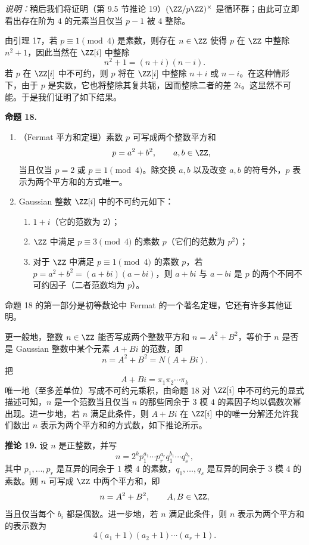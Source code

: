 \noindent\emph{说明：}稍后我们将证明（第 9.5 节推论 19）$(\ZZ/p\ZZ)^\times$ 是循环群；由此可立即看出存在阶为 $4$ 的元素当且仅当 $p-1$ 被 $4$ 整除。

由引理 17，若 $p\equiv1\pmod4$ 是素数，则存在 $n\in\ZZ$ 使得 $p$ 在 $\ZZ$ 中整除 $n^2+1$，因此当然在 $\ZZ[i]$ 中整除
\[
n^2+1=(n+i)(n-i).
\]
若 $p$ 在 $\ZZ[i]$ 中不可约，则 $p$ 将在 $\ZZ[i]$ 中整除 $n+i$ 或 $n-i$。在这种情形下，由于 $p$ 是实数，它也将整除其复共轭，因而整除二者的差 $2i$。这显然不可能。于是我们证明了如下结果。

\medskip
\noindent\textbf{命题 18.}
\begin{enumerate}[label=(\arabic*)]
	\item （Fermat 平方和定理）素数 $p$ 可写成两个整数平方和
	\[
	p=a^2+b^2,
	\qquad a,b\in\ZZ,
	\]
	当且仅当 $p=2$ 或 $p\equiv1\pmod4$。除交换 $a,b$ 以及改变 $a,b$ 的符号外，$p$ 表示为两个平方和的方式唯一。
	\item Gaussian 整数 $\ZZ[i]$ 中的不可约元如下：
	\begin{enumerate}[label=(\alph*)]
		\item $1+i$（它的范数为 $2$）；
		\item $\ZZ$ 中满足 $p\equiv3\pmod4$ 的素数 $p$（它们的范数为 $p^2$）；
		\item 对于 $\ZZ$ 中满足 $p\equiv1\pmod4$ 的素数 $p$，若 $p=a^2+b^2=(a+bi)(a-bi)$，则 $a+bi$ 与 $a-bi$ 是 $p$ 的两个不同不可约因子（二者范数均为 $p$）。
	\end{enumerate}
\end{enumerate}

命题 18 的第一部分是初等数论中 Fermat 的一个著名定理，它还有许多其他证明。

更一般地，整数 $n\in\ZZ$ 能否写成两个整数平方和 $n=A^2+B^2$，等价于 $n$ 是否是 Gaussian 整数中某个元素 $A+Bi$ 的范数，即
\[
n=A^2+B^2=N(A+Bi).
\]
把
\[
A+Bi=\pi_1\pi_2\cdots\pi_k
\]
唯一地（至多差单位）写成不可约元乘积，由命题 18 对 $\ZZ[i]$ 中不可约元的显式描述可知，$n$ 是一个范数当且仅当 $n$ 的那些同余于 $3$ 模 $4$ 的素因子均以偶数次幂出现。进一步地，若 $n$ 满足此条件，则 $A+Bi$ 在 $\ZZ[i]$ 中的唯一分解还允许我们数出 $n$ 表示为两个平方和的方式数，如下推论所示。

\medskip
\noindent\textbf{推论 19.}
设 $n$ 是正整数，并写
\[
n=2^k p_1^{a_1}\cdots p_r^{a_r}q_1^{b_1}\cdots q_s^{b_s},
\]
其中 $p_1,\ldots,p_r$ 是互异的同余于 $1$ 模 $4$ 的素数，$q_1,\ldots,q_s$ 是互异的同余于 $3$ 模 $4$ 的素数。则 $n$ 可写成 $\ZZ$ 中两个平方和，即
\[
n=A^2+B^2,
\qquad A,B\in\ZZ,
\]
当且仅当每个 $b_i$ 都是偶数。进一步地，若 $n$ 满足此条件，则 $n$ 表示为两个平方和的表示数为
\[
4(a_1+1)(a_2+1)\cdots(a_r+1).
\]


